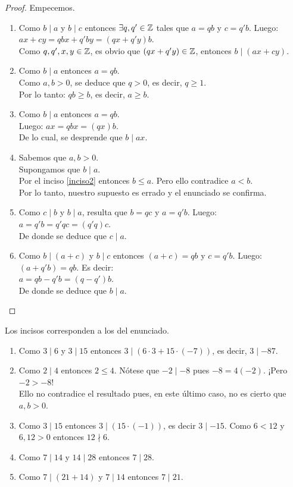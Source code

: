\begin{proof} Empecemos.
\begin{enumerate}[label=\roman*)]
\item Como $b \mid a$ \; y \; $b \mid c$ entonces $\exists q,q' \in \mathbb{Z}$ tales que $a = qb$ y $c = q'b$.
Luego: $ax + cy = qbx + q'by = (qx + q'y)b$. \\
Como $q,q',x,y \in \mathbb{Z}$, es obvio que $(qx + q'y) \in \mathbb{Z}$, entonces $b \mid (ax + cy)$. 
\item Como $b \mid a$ entonces $a = qb$. \\
Como $a,b > 0$, se deduce que $q > 0$, es decir, $q \geq 1$. \\
Por lo tanto: $qb \geq b$, es decir, $a \geq b$.  \label{inciso2}
\item Como $b \mid a$ entonces $a = qb$. \\
Luego: $ax = qbx = (qx)b$. \\
De lo cual, se desprende que $b \mid ax$. \\
\item Sabemos que $a,b >0$. \\
Supongamos que $b \mid a$. \\
Por el inciso \ref{inciso2} entonces $b \leq a$. Pero ello contradice $a<b$. \\
Por lo tanto, nuestro supuesto es errado y el enunciado se confirma. 
\item Como $c \mid b$ \; y \; $b \mid a$, resulta que $b = qc$ \; y \; $a = q'b$. Luego: \\
$a = q'b = q'qc = (q'q)c$. \\
De donde se deduce que $c \mid a$. 
\item Como $b \mid (a+c)$ \; y \; $b \mid c$ entonces $(a+c)=qb$ \; y \; $c=q'b$. Luego: \\
$(a+q'b) = qb$. Es decir: \\
$a = qb-q'b = (q-q')b$. \\
De donde se deduce que $b \mid a$.
\end{enumerate}
\end{proof}

\begin{ejemplo} Los incisos corresponden a los del enunciado. 
\begin{enumerate}[label=\roman*)]
\item Como $3 \mid 6$ \; y \; $3 \mid 15$ entonces $3 \mid (6 \cdot 3 + 15 \cdot (-7))$, es decir, $3 \mid -87$.
\item Como $2 \mid 4$ entonces $2 \leq 4$. 
Nótese que $-2 \mid -8$ pues $-8 = 4(-2)$. ¡Pero $-2 > -8$! \\
Ello no contradice el resultado pues, en este último caso, no es cierto que $a,b > 0$. 
\item Como $3 \mid 15$ entonces $3 \mid (15 \cdot (-1))$, es decir $3 \mid -15$.
Como $6 < 12$ \; y \; $6,12 > 0$ entonces $12 \nmid 6$.
\item Como $7 \mid 14$ \; y \; $14 \mid 28$ entonces $7 \mid 28$. 
\item Como $7 \mid (21+14)$ \; y \; $7 \mid 14$ entonces $7 \mid 21$.
\end{enumerate} \end{ejemplo}


